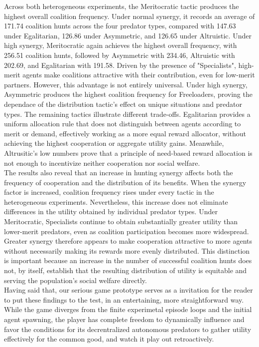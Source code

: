 \documentclass[12pt,a4paper]{report}
\begin{document}
	Across both heterogeneous experiments, the Meritocratic tactic produces the highest overall coalition frequency. Under normal synergy, it records an average of 171.74 coalition hunts across the four predator types, compared with 147.63 under Egalitarian, 126.86 under Asymmetric, and 126.65 under Altruistic. Under high synergy, Meritocratic again achieves the highest overall frequency, with 256.51 coalition hunts, followed by Asymmetric with 234.46, Altruistic with 202.69, and Egalitarian with 191.58. Driven by the presence of "Specialists", high-merit agents make coalitions attractive with their contribution, even for low-merit partners. However, this advantage is not entirely universal. Under high synergy, Asymmetric produces the highest coalition frequency for Freeloaders, proving the dependace of the distribution tactic's effect on unique situations and predator types. The remaining tactics illustrate different trade-offs. Egalitarian provides a uniform allocation rule that does not distinguish between agents according to merit or demand, effectively working as a more equal reward allocator, without achieving the highest cooperation or aggregate utility gains. Meanwhile, Altrusitic's low numbers prove that a principle of need-based reward allocation is not enough to incentivize neither cooperation nor social welfare. \\

	The results also reveal that an increase in hunting synergy affects both the frequency of cooperation and the distribution of its benefits. When the synergy factor is increased, coalition frequency rises under every tactic in the heterogeneous experiments. Nevertheless, this increase does not eliminate differences in the utility obtained by individual predator types. Under Meritocratic, Specialists continue to obtain substantially greater utility than lower-merit predators, even as coalition participation becomes more widespread. Greater synergy therefore appears to make cooperation attractive to more agents without necessarily making its rewards more evenly distributed. This distinction is important because an increase in the number of successful coalition hunts does not, by itself, establish that the resulting distribution of utility is equitable and serving the population's social welfare directly. \\
	
	Having said that, our serious game prototype serves as a invitation for the reader to put these findings to the test, in an entertaining, more straightforward way. While the game diverges from the finite experimetal episode loops and the initial agent spawning, the player has complete freedom to dynamically influence and favor the conditions for its decrentralized autonomous predators to gather utility effectively for the common good, and watch it play out retroactively. 
\end{document}

